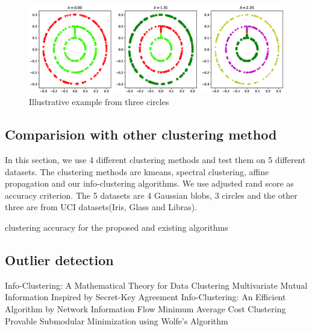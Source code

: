 \documentclass{article}
\theoremstyle{definition}
\begin{document}
\begin{figure}[!ht]
\includegraphics[width=12cm]{pic/3circle.eps}
\caption{Illustrative example from three circles}\label{fig:3c}
\end{figure}
\subsection{Comparision with other clustering method}
In this section, we use 4 different clustering methods and test them on 5 different datasets. The clustering methods are kmeans, spectral clustering, affine propagation and our info-clustering algorithms. We use adjusted rand score as accuracy criterion. The 5 datasets are 4 Gaussian blobs, 3 circles and the other three are from UCI datasets(Iris, Glass and Libras).
\begin{table}[!ht]
\centering
{}
\caption{clustering accuracy for the proposed and existing algorithms}
\end{table}
\subsection{Outlier detection}
\begin{thebibliography}{9}
Info-Clustering: A Mathematical Theory for Data Clustering
 Multivariate Mutual Information Inspired by Secret-Key Agreement
 Info-Clustering: An Efficient Algorithm by Network Information Flow
 Minimum Average Cost Clustering
 Provable Submodular Minimization using Wolfe's Algorithm
\end{thebibliography}
\end{document}
